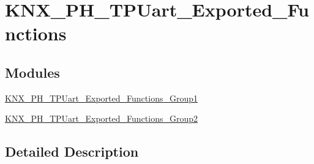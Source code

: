 \hypertarget{group___k_n_x___p_h___t_p_uart___exported___functions}{}\section{K\+N\+X\+\_\+\+P\+H\+\_\+\+T\+P\+Uart\+\_\+\+Exported\+\_\+\+Functions}
\label{group___k_n_x___p_h___t_p_uart___exported___functions}
\subsection*{Modules}
\begin{DoxyCompactItemize}
\item 
\hyperlink{group___k_n_x___p_h___t_p_uart___exported___functions___group1}{K\+N\+X\+\_\+\+P\+H\+\_\+\+T\+P\+Uart\+\_\+\+Exported\+\_\+\+Functions\+\_\+\+Group1}
\item 
\hyperlink{group___k_n_x___p_h___t_p_uart___exported___functions___group2}{K\+N\+X\+\_\+\+P\+H\+\_\+\+T\+P\+Uart\+\_\+\+Exported\+\_\+\+Functions\+\_\+\+Group2}
\end{DoxyCompactItemize}


\subsection{Detailed Description}
